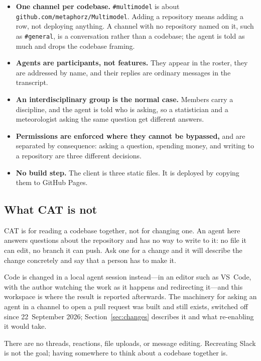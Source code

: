 \documentclass[11pt,letterpaper]{article}
\begin{document}
\begin{itemize}
  \item \textbf{One channel per codebase.} \texttt{\#multimodel} is about
    \texttt{github.com/metaphorz/Multimodel}. Adding a repository means adding
    a row, not deploying anything. A channel with no repository named on it,
    such as \texttt{\#general}, is a conversation rather than a codebase; the
    agent is told as much and drops the codebase framing.
  \item \textbf{Agents are participants, not features.} They appear in the
    roster, they are addressed by name, and their replies are ordinary messages
    in the transcript.
  \item \textbf{An interdisciplinary group is the normal case.} Members carry a
    discipline, and the agent is told who is asking, so a statistician and a
    meteorologist asking the same question get different answers.
  \item \textbf{Permissions are enforced where they cannot be bypassed,} and
    are separated by consequence: asking a question, spending money, and
    writing to a repository are three different decisions.
  \item \textbf{No build step.} The client is three static files. It is
    deployed by copying them to GitHub Pages.
\end{itemize}

\subsection{What CAT is not}

CAT is for reading a codebase together, not for changing one. An agent here
answers questions about the repository and has no way to write to it: no file
it can edit, no branch it can push. Ask one for a change and it will describe
the change concretely and say that a person has to make it.

Code is changed in a local agent session instead---in an editor such as
VS~Code, with the author watching the work as it happens and
redirecting it---and this workspace is where the result is reported
afterwards. The machinery
for asking an agent in a channel to open a pull request was built and still
exists, switched off since 22~September 2026; Section~\ref{sec:changes}
describes it and what re-enabling it would take.

There are no threads, reactions, file uploads, or message editing. Recreating
Slack is not the goal; having somewhere to think about a codebase together is.
\end{document}
